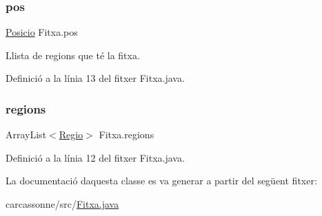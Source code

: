 \subsubsection{\texorpdfstring{pos}{pos}}
{\footnotesize\ttfamily \mbox{\hyperlink{class_posicio}{Posicio}} Fitxa.\+pos\hspace{0.3cm}{\ttfamily [private]}}



Llista de regions que té la fitxa. 



Definició a la línia 13 del fitxer Fitxa.\+java.

\mbox{\label{class_fitxa_ad58813fa3873ce12e3c7960058701195}} 
\subsubsection{\texorpdfstring{regions}{regions}}
{\footnotesize\ttfamily Array\+List$<$\mbox{\hyperlink{class_regio}{Regio}}$>$ Fitxa.\+regions\hspace{0.3cm}{\ttfamily [private]}}



Definició a la línia 12 del fitxer Fitxa.\+java.



La documentació d\textquotesingle{}aquesta classe es va generar a partir del següent fitxer\+:\begin{DoxyCompactItemize}
\item 
carcassonne/src/\mbox{\hyperlink{_fitxa_8java}{Fitxa.\+java}}\end{DoxyCompactItemize}
